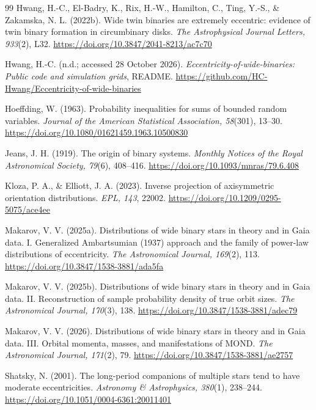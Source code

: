 \documentclass[11pt,a4paper]{article}
\theoremstyle{remark}\newtheorem{remark}[theorem]{Remark}
\begin{document}
\begin{thebibliography}{99}
Hwang, H.-C., El-Badry, K., Rix, H.-W., Hamilton, C., Ting, Y.-S., \& Zakamska, N. L. (2022b). Wide twin binaries are extremely eccentric: evidence of twin binary formation in circumbinary disks. \emph{The Astrophysical Journal Letters, 933}(2), L32. \url{https://doi.org/10.3847/2041-8213/ac7c70}

Hwang, H.-C. (n.d.; accessed 28 October 2026). \emph{Eccentricity-of-wide-binaries: Public code and simulation grids}, README. \url{https://github.com/HC-Hwang/Eccentricity-of-wide-binaries}

Hoeffding, W. (1963). Probability inequalities for sums of bounded random variables. \emph{Journal of the American Statistical Association, 58}(301), 13--30. \url{https://doi.org/10.1080/01621459.1963.10500830}

Jeans, J. H. (1919). The origin of binary systems. \emph{Monthly Notices of the Royal Astronomical Society, 79}(6), 408--416. \url{https://doi.org/10.1093/mnras/79.6.408}

Kloza, P. A., \& Elliott, J. A. (2023). Inverse projection of axisymmetric orientation distributions. \emph{EPL, 143}, 22002. \url{https://doi.org/10.1209/0295-5075/ace4ee}

Makarov, V. V. (2025a). Distributions of wide binary stars in theory and in Gaia data. I. Generalized Ambartsumian (1937) approach and the family of power-law distributions of eccentricity. \emph{The Astronomical Journal, 169}(2), 113. \url{https://doi.org/10.3847/1538-3881/ada5fa}

Makarov, V. V. (2025b). Distributions of wide binary stars in theory and in Gaia data. II. Reconstruction of sample probability density of true orbit sizes. \emph{The Astronomical Journal, 170}(3), 138. \url{https://doi.org/10.3847/1538-3881/adec79}

Makarov, V. V. (2026). Distributions of wide binary stars in theory and in Gaia data. III. Orbital momenta, masses, and manifestations of MOND. \emph{The Astronomical Journal, 171}(2), 79. \url{https://doi.org/10.3847/1538-3881/ae2757}

Shatsky, N. (2001). The long-period companions of multiple stars tend to have moderate eccentricities. \emph{Astronomy \& Astrophysics, 380}(1), 238--244. \url{https://doi.org/10.1051/0004-6361:20011401}


\end{thebibliography}
\end{document}
